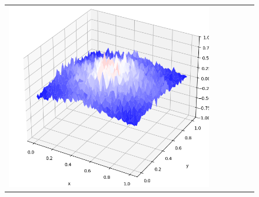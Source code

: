 \documentclass[12pt, reqno]{report}
\theoremstyle{definition}
\theoremstyle{remark}
\begin{document}
\begin{figure}[H]
\begin{tabular}{rccccc}
        \includegraphics[align = c, height=\subheight]{media_paper/surf_MD_n=1000.png} \\


\end{tabular}
\end{figure}
\end{document}
